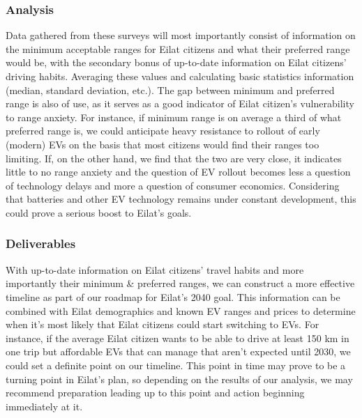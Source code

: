 \documentclass{article}                         %
\begin{document}
\subsubsection{Analysis}
Data gathered from these surveys will most importantly consist of information on the minimum acceptable ranges for Eilat citizens and what their preferred range would be, with the secondary bonus of up-to-date information on Eilat citizens' driving habits. Averaging these values and calculating basic statistics information (median, standard deviation, etc.). The gap between minimum and preferred range is also of use, as it serves as a good indicator of Eilat citizen's vulnerability to range anxiety. For instance, if minimum range is on average a third of what preferred range is, we could anticipate heavy resistance to rollout of early (modern) EVs on the basis that most citizens would find their ranges too limiting. If, on the other hand, we find that the two are very close, it indicates little to no range anxiety and the question of EV rollout becomes less a question of technology delays and more a question of consumer economics. Considering that batteries and other EV technology remains under constant development, this could prove a serious boost to Eilat's goals.

\subsubsection{Deliverables}
With up-to-date information on Eilat citizens' travel habits and more importantly their minimum \& preferred ranges, we can construct a more effective timeline as part of our roadmap for Eilat's 2040 goal. This information can be combined with Eilat demographics and known EV ranges and prices to determine when it's most likely that Eilat citizens could start switching to EVs. For instance, if the average Eilat citizen wants to be able to drive at least 150 km in one trip but affordable EVs that can manage that aren't expected until 2030, we could set a definite point on our timeline. This point in time may prove to be a turning point in Eilat's plan, so depending on the results of our analysis, we may recommend preparation leading up to this point and action beginning immediately at it.
\end{document}
